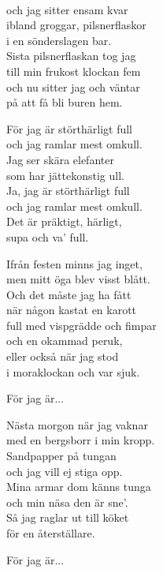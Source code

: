 \newpage


\\
och jag sitter ensam kvar\\
ibland groggar, pilsnerflaskor\\
i en sönderslagen bar.\\
Sista pilsnerflaskan tog jag\\
till min frukost klockan fem\\
och nu sitter jag och väntar\\
på att få bli buren hem.

För jag är störthärligt full\\
och jag ramlar mest omkull.\\
Jag ser skära elefanter\\
som har jättekonstig ull.\\
Ja, jag är störthärligt full\\
och jag ramlar mest omkull.\\
Det är präktigt, härligt,\\
supa och va' full.

Ifrån festen minns jag inget,\\
men mitt öga blev visst blått.\\
Och det måste jag ha fått\\
när någon kastat en karott\\
full med vispgrädde och fimpar\\
och en okammad peruk,\\
eller också när jag stod\\
i moraklockan och var sjuk.

För jag är...

Nästa morgon när jag vaknar\\
med en bergsborr i min kropp.\\
Sandpapper på tungan\\
och jag vill ej stiga opp.\\
Mina armar dom känns tunga\\
och min näsa den är sne'.\\
Så jag raglar ut till köket\\
för en återställare.

För jag är...\\


